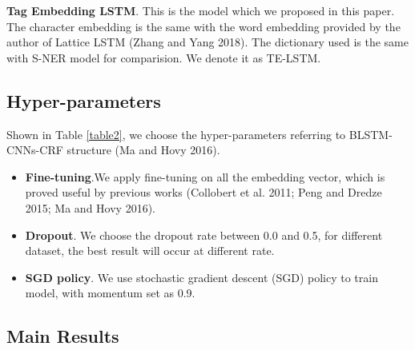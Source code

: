 \documentclass[letterpaper]{article} %
\begin{document}
\textbf{Tag Embedding LSTM}. This is the model which we proposed in this paper. The character embedding is the same with the word embedding provided by the author of Lattice LSTM (Zhang and Yang 2018). The dictionary used is the same with S-NER model for comparision. We denote it as TE-LSTM.

\subsection{Hyper-parameters}

Shown in Table \ref{table2}, we choose the hyper-parameters referring to BLSTM-CNNs-CRF structure (Ma and Hovy 2016). 

\begin{itemize}
\item \textbf{Fine-tuning}.We apply fine-tuning on all the embedding vector, which is proved useful by previous works (Collobert et al. 2011; Peng and Dredze 2015; Ma and Hovy 2016). 
\item \textbf{Dropout}. We choose the dropout rate between 0.0 and 0.5, for different dataset, the best result will occur at different rate.
\item \textbf{SGD policy}. We use stochastic gradient descent (SGD) policy to train model, with momentum set as 0.9.
\end{itemize}

\subsection{Main Results}

\begin{table}[t]
\caption{Main Results on MSRA.}\smallskip
\centering
{}
\label{table_msra}
\end{table}
\end{document}
